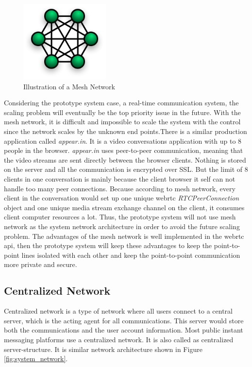\begin{figure}
	\centering
    	\includegraphics[width=0.40\textwidth,natwidth=610,natheight=642]{figs/mesh_network.png}
  	\caption{Illustration of a Mesh Network \cite{wiki:mesh_network}}
  	\label{fig:mesh_network}
\end{figure}

\par Considering the prototype system case, a real-time communication system, the scaling problem will eventually be the top priority issue in the future. With the mesh network, it is difficult and impossible to scale the system with the control since the network scales by the unknown end points.There is a similar production application called \textit{appear.in}. It is a video conversations application with up to 8 people in the browser. \textit{appear.in} uses peer-to-peer communication, meaning that the video streams are sent directly between the browser clients. Nothing is stored on the server and all the communication is encrypted over SSL. But the limit of 8 clients in one conversation is mainly because the client browser it self can not handle too many peer connections. Because according to mesh network, every client in the conversation would set up one unique \gls{webrtc} \textit{RTCPeerConnection} object and one unique media stream exchange channel on the client, it consumes client computer resources a lot. Thus, the prototype system will not use mesh network as the system network architecture in order to avoid the future scaling problem. The advantages of the mesh network is well implemented in the \gls{webrtc} api, then the prototype system will keep these advantages to keep the point-to-point lines isolated with each other and keep the point-to-point communication more private and secure.

\subsection{Centralized Network}

\par Centralized network is a type of network where all users connect to a central server, which is the acting agent for all communications. This server would store both the communications and the user account information. Most public instant messaging platforms use a centralized network. It is also called as centralized server-structure.\cite{webopedia:centralized_network} It is similar network architecture shown in Figure \ref{fig:system_network}.


